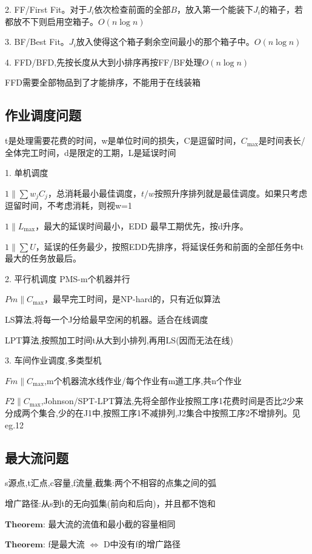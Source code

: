 \documentclass[letterpaper]{article}
\newcommand{\theo}{\textbf{Theorem:}}
\begin{document}
2. FF/First Fit。对于$J_i$依次检查前面的全部$B$，放入第一个能装下$J_i$的箱子，若都放不下则启用空箱子。$O(n\log n)$

3. BF/Best Fit。$J_i$放入使得这个箱子剩余空间最小的那个箱子中。$O(n\log n)$

4. FFD/BFD,先按长度从大到小排序再按FF/BF处理$O(n\log n)$

FFD需要全部物品到了才能排序，不能用于在线装箱


\subsection{作业调度问题}

t是处理需要花费的时间，w是单位时间的损失，C是逗留时间，$C_{\max}$是时间表长/全体完工时间，d是限定的工期，L是延误时间

1. 单机调度

$1\| \sum w_j C_j$，总消耗最小最佳调度，$t/w$按照升序排列就是最佳调度。如果只考虑逗留时间，不考虑消耗，则视w=1

$1\| L_{\max}$，最大的延误时间最小，EDD 最早工期优先，按d升序。

$1\| \sum U$，延误的任务最少，按照EDD先排序，将延误任务和前面的全部任务中t最大的任务放最后。

2. 平行机调度 PMS-m个机器并行

$Pm\|C_{\max}$，最早完工时间，是NP-hard的，只有近似算法

LS算法,将每一个J分给最早空闲的机器。适合在线调度

LPT算法,按照加工时间t从大到小排列,再用LS(因而无法在线)

3. 车间作业调度,多类型机

$Fm\|C_{\max}$,m个机器流水线作业/每个作业有m道工序,共n个作业

$F2\|C_{\max}$,Johnson/SPT-LPT算法,先将全部作业按照工序1花费时间是否比2少来分成两个集合,少的在J1中,按照工序1不减排列,J2集合中按照工序2不增排列。见eg.12

\subsection{最大流问题}

s源点,t汇点,c容量,f流量,截集:两个不相容的点集之间的弧

增广路径:从s到t的无向弧集(前向和后向)，并且都不饱和

$\theo$ 最大流的流值和最小截的容量相同

$\theo$ f是最大流 $\iff$ D中没有f的增广路径


% 
% 
\end{document}
